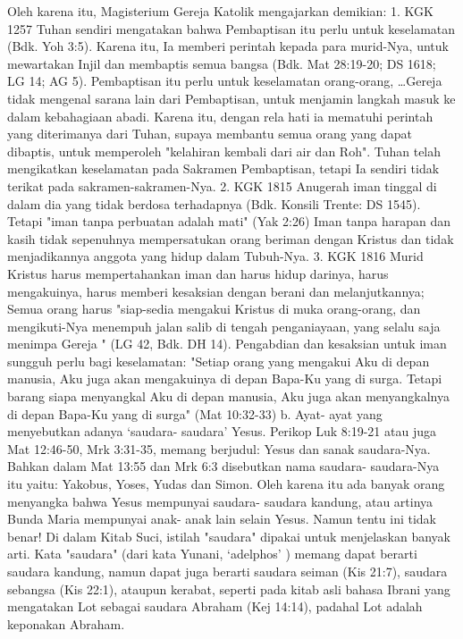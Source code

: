Oleh karena itu, Magisterium Gereja Katolik mengajarkan demikian:
1.    KGK 1257 Tuhan sendiri mengatakan bahwa Pembaptisan itu perlu untuk keselamatan (Bdk. Yoh 3:5). Karena itu, Ia memberi perintah kepada para murid-Nya, untuk mewartakan Injil dan membaptis semua bangsa (Bdk. Mat 28:19-20; DS 1618; LG 14; AG 5). Pembaptisan itu perlu untuk keselamatan orang-orang, …Gereja tidak mengenal sarana lain dari Pembaptisan, untuk menjamin langkah masuk ke dalam kebahagiaan abadi. Karena itu, dengan rela hati ia mematuhi perintah yang diterimanya dari Tuhan, supaya membantu semua orang yang dapat dibaptis, untuk memperoleh "kelahiran kembali dari air dan Roh". Tuhan telah mengikatkan keselamatan pada Sakramen Pembaptisan, tetapi Ia sendiri tidak terikat pada sakramen-sakramen-Nya.
2.    KGK 1815 Anugerah iman tinggal di dalam dia yang tidak berdosa terhadapnya (Bdk. Konsili Trente: DS 1545). Tetapi "iman tanpa perbuatan adalah mati" (Yak 2:26) Iman tanpa harapan dan kasih tidak sepenuhnya mempersatukan orang beriman dengan Kristus dan tidak menjadikannya anggota yang hidup dalam Tubuh-Nya.
3.    KGK 1816 Murid Kristus harus mempertahankan iman dan harus hidup darinya, harus mengakuinya, harus memberi kesaksian dengan berani dan melanjutkannya; Semua orang harus "siap-sedia mengakui Kristus di muka orang-orang, dan mengikuti-Nya menempuh jalan salib di tengah penganiayaan, yang selalu saja menimpa Gereja " (LG 42, Bdk. DH 14). Pengabdian dan kesaksian untuk iman sungguh perlu bagi keselamatan: "Setiap orang yang mengakui Aku di depan manusia, Aku juga akan mengakuinya di depan Bapa-Ku yang di surga. Tetapi barang siapa menyangkal Aku di depan manusia, Aku juga akan menyangkalnya di depan Bapa-Ku yang di surga" (Mat 10:32-33)
b. Ayat- ayat yang menyebutkan adanya ‘saudara- saudara’ Yesus.
Perikop Luk 8:19-21 atau juga Mat 12:46-50, Mrk 3:31-35, memang berjudul: Yesus dan sanak saudara-Nya. Bahkan dalam Mat 13:55 dan Mrk 6:3 disebutkan nama saudara- saudara-Nya itu yaitu: Yakobus, Yoses, Yudas dan Simon. Oleh karena itu ada banyak orang menyangka bahwa Yesus mempunyai saudara- saudara kandung, atau artinya Bunda Maria mempunyai anak- anak lain selain Yesus. Namun tentu ini tidak benar!
Di dalam Kitab Suci, istilah "saudara" dipakai untuk menjelaskan banyak arti. Kata "saudara" (dari kata Yunani, ‘adelphos’ ) memang dapat berarti saudara kandung, namun dapat juga berarti saudara seiman (Kis 21:7), saudara sebangsa (Kis 22:1), ataupun kerabat, seperti pada kitab asli bahasa Ibrani yang mengatakan Lot sebagai saudara Abraham (Kej 14:14), padahal Lot adalah keponakan Abraham.

